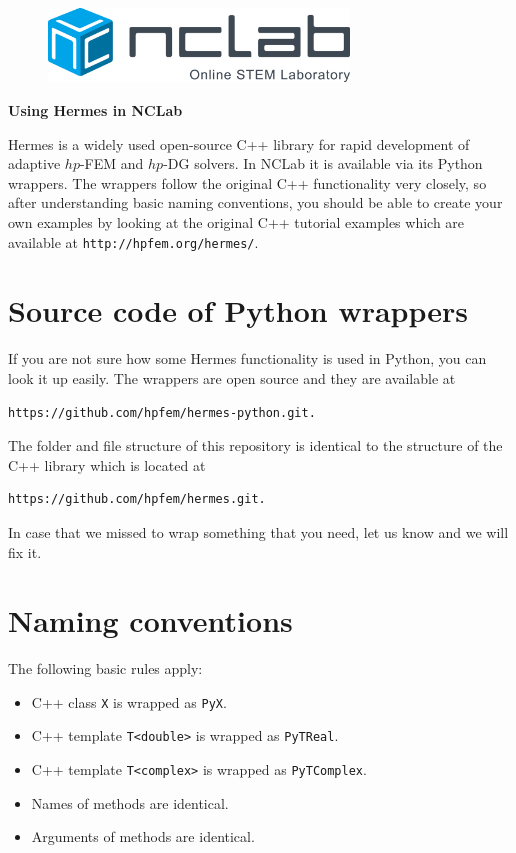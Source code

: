 \documentclass{article}
\begin{document}
\large

\vbox{}
\begin{figure}[!ht]
\includegraphics[width=8cm]{logo.png}
\vspace{4mm}
\end{figure}

\centerline{\huge \bf Using Hermes in NCLab}
\vspace{6mm}
\noindent
Hermes is a widely used open-source C++ library for rapid development of adaptive $hp$-FEM and $hp$-DG solvers.
In NCLab it is available via its Python wrappers. The wrappers follow the original C++ 
functionality very closely, so after understanding basic naming conventions, you should
be able to create your own examples by looking at the original C++ tutorial examples
which are available at {\tt http://hpfem.org/hermes/}.

\section*{Source code of Python wrappers}

If you are not sure how some Hermes functionality is used in Python, 
you can look it up easily. The wrappers are open source and they are 
available at

\begin{verbatim}
https://github.com/hpfem/hermes-python.git.
\end{verbatim} 
The folder and file structure of this repository is identical to 
the structure of the C++ library which is located at 

\begin{verbatim}
https://github.com/hpfem/hermes.git.
\end{verbatim} 
In case that we missed to wrap something that you need, let us know
and we will fix it.

\section*{Naming conventions}

The following basic rules apply:

\begin{itemize}
\item C++ class {\tt X} is wrapped as {\tt PyX}. 
\item C++ template {\tt T<double>} is wrapped as {\tt PyTReal}.  
\item C++ template {\tt T<complex>} is wrapped as {\tt PyTComplex}.  
\item Names of methods are identical. 
\item Arguments of methods are identical. 
\end{itemize}
\end{document}
